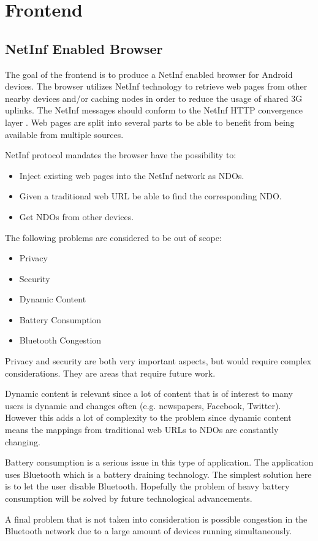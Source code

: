 \section{Frontend}

\subsection{NetInf Enabled Browser}

The goal of the frontend is to produce a NetInf enabled browser for Android devices. The browser utilizes NetInf technology to retrieve web pages from other nearby devices and/or caching nodes in order to reduce the usage of shared 3G uplinks. The NetInf messages should conform to the NetInf HTTP convergence layer \cite{netinfproto}. Web pages are split into several parts to be able to benefit from being available from multiple sources.

NetInf protocol mandates the browser have the possibility to:

\begin{itemize}
	\item Inject existing web pages into the NetInf network as NDOs.
	\item Given a traditional web URL be able to find the corresponding NDO.
	\item Get NDOs from other devices.
\end{itemize}

The following problems are considered to be out of scope:

\begin{itemize}
	\item Privacy
	\item Security
	\item Dynamic Content
	\item Battery Consumption
	\item Bluetooth Congestion
\end{itemize}

Privacy and security are both very important aspects, but would require complex considerations. They are areas that require future work.

Dynamic content is relevant since a lot of content that is of interest to many users is dynamic and changes often (e.g. newspapers, Facebook, Twitter). However this adds a lot of complexity to the problem since dynamic content means the mappings from traditional web URLs to NDOs are constantly changing.

Battery consumption is a serious issue in this type of application. The application uses Bluetooth which is a battery draining technology. The simplest solution here is to let the user disable Bluetooth. Hopefully the problem of heavy battery consumption will be solved by future technological advancements.

A final problem that is not taken into consideration is possible congestion in the Bluetooth network due to a large amount of devices running simultaneously.